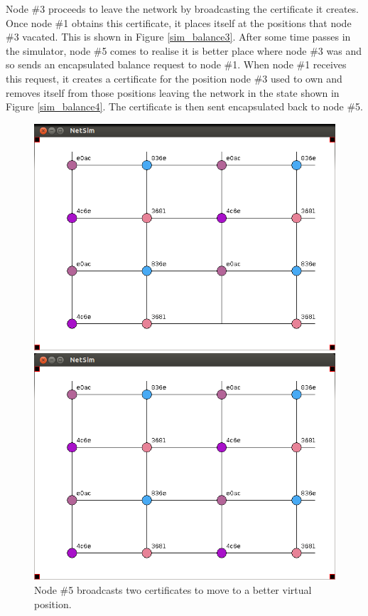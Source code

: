 \documentclass[ %
                    author={Luke Murray},
                supervisor={Dr. Simon Hollis},
                     title={Shadow Peer-to-Peer Networks},
                  subtitle={},
                    degree={MEng},
                      year={2013} ]{thesis}
\begin{document}
Node \#3 proceeds to leave the network by broadcasting the certificate it creates. Once node \#1 obtains this certificate, it places itself at the positions that node \#3 vacated. This is shown in Figure \ref{sim_balance3}. After some time passes in the simulator, node \#5 comes to realise it is better place where node \#3 was and so sends an encapsulated balance request to node \#1. When node \#1 receives this request, it creates a certificate for the position node \#3 used to own and removes itself from those positions leaving the network in the state shown in Figure \ref{sim_balance4}. The certificate is then sent encapsulated back to node \#5.

\begin{figure}[h]
    \centering
    \begin{minipage}[b]{0.45\linewidth}
        \centering
        \includegraphics[width=\linewidth]{sim_pics/balance_8.png}
        \caption{Node \#5 broadcasts two certificates to move to a better virtual position.}
        \label{sim_balance5}
    \end{minipage}
    \hspace{0.5cm}
    \begin{minipage}[b]{0.45\linewidth}
        \centering
        \includegraphics[width=\linewidth]{sim_pics/balance_9.png}

\end{minipage}
\end{figure}
\end{document}
